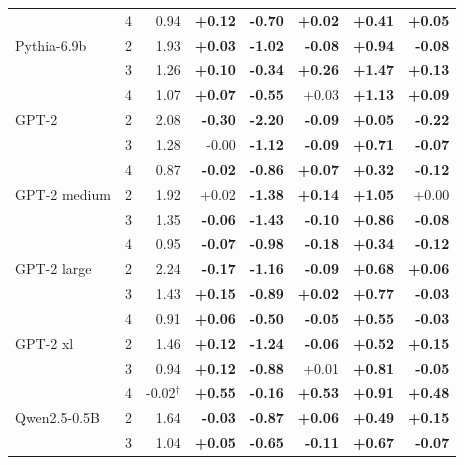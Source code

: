 \begin{tabular}{lrrrrrrr}
 & 4 & 0.94 & \textbf{+0.12} & \textbf{-0.70} & \textbf{+0.02} & \textbf{+0.41} & \textbf{+0.05} \\
\addlinespace[2pt]
Pythia-6.9b & 2 & 1.93 & \textbf{+0.03} & \textbf{-1.02} & \textbf{-0.08} & \textbf{+0.94} & \textbf{-0.08} \\
 & 3 & 1.26 & \textbf{+0.10} & \textbf{-0.34} & \textbf{+0.26} & \textbf{+1.47} & \textbf{+0.13} \\
 & 4 & 1.07 & \textbf{+0.07} & \textbf{-0.55} & +0.03 & \textbf{+1.13} & \textbf{+0.09} \\
\addlinespace[2pt]
GPT-2 & 2 & 2.08 & \textbf{-0.30} & \textbf{-2.20} & \textbf{-0.09} & \textbf{+0.05} & \textbf{-0.22} \\
 & 3 & 1.28 & -0.00 & \textbf{-1.12} & \textbf{-0.09} & \textbf{+0.71} & \textbf{-0.07} \\
 & 4 & 0.87 & \textbf{-0.02} & \textbf{-0.86} & \textbf{+0.07} & \textbf{+0.32} & \textbf{-0.12} \\
\addlinespace[2pt]
GPT-2 medium & 2 & 1.92 & +0.02 & \textbf{-1.38} & \textbf{+0.14} & \textbf{+1.05} & +0.00 \\
 & 3 & 1.35 & \textbf{-0.06} & \textbf{-1.43} & \textbf{-0.10} & \textbf{+0.86} & \textbf{-0.08} \\
 & 4 & 0.95 & \textbf{-0.07} & \textbf{-0.98} & \textbf{-0.18} & \textbf{+0.34} & \textbf{-0.12} \\
\addlinespace[2pt]
GPT-2 large & 2 & 2.24 & \textbf{-0.17} & \textbf{-1.16} & \textbf{-0.09} & \textbf{+0.68} & \textbf{+0.06} \\
 & 3 & 1.43 & \textbf{+0.15} & \textbf{-0.89} & \textbf{+0.02} & \textbf{+0.77} & \textbf{-0.03} \\
 & 4 & 0.91 & \textbf{+0.06} & \textbf{-0.50} & \textbf{-0.05} & \textbf{+0.55} & \textbf{-0.03} \\
\addlinespace[2pt]
GPT-2 xl & 2 & 1.46 & \textbf{+0.12} & \textbf{-1.24} & \textbf{-0.06} & \textbf{+0.52} & \textbf{+0.15} \\
 & 3 & 0.94 & \textbf{+0.12} & \textbf{-0.88} & +0.01 & \textbf{+0.81} & \textbf{-0.05} \\
 & 4 & -0.02$^\dagger$ & \textbf{+0.55} & \textbf{-0.16} & \textbf{+0.53} & \textbf{+0.91} & \textbf{+0.48} \\
\addlinespace[2pt]
Qwen2.5-0.5B & 2 & 1.64 & \textbf{-0.03} & \textbf{-0.87} & \textbf{+0.06} & \textbf{+0.49} & \textbf{+0.15} \\
 & 3 & 1.04 & \textbf{+0.05} & \textbf{-0.65} & \textbf{-0.11} & \textbf{+0.67} & \textbf{-0.07} \\

\end{tabular}
